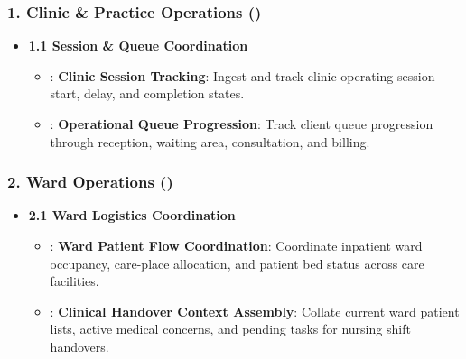 \subsubsection*{1. Clinic \& Practice Operations (\texttt{})}
\label{rad:enabling:482}

\begin{itemize}

\item
\textbf{1.1 Session \& Queue Coordination}


\begin{itemize}

\item
\texttt{}: \textbf{Clinic Session Tracking}: Ingest and track clinic operating session start, delay, and completion states.



\item
\texttt{}: \textbf{Operational Queue Progression}: Track client queue progression through reception, waiting area, consultation, and billing.



\end{itemize}


\end{itemize}
\label{rad:enabling:486}
\subsubsection*{2. Ward Operations (\texttt{})}
\label{rad:enabling:487}

\begin{itemize}

\item
\textbf{2.1 Ward Logistics Coordination}


\begin{itemize}

\item
\texttt{}: \textbf{Ward Patient Flow Coordination}: Coordinate inpatient ward occupancy, care-place allocation, and patient bed status across care facilities.



\item
\texttt{}: \textbf{Clinical Handover Context Assembly}: Collate current ward patient lists, active medical concerns, and pending tasks for nursing shift handovers.



\end{itemize}


\end{itemize}
\label{rad:enabling:491}
